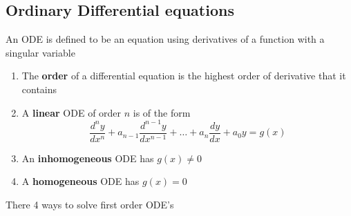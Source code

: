 \documentclass[11pt,titlepage]{article}
\numberwithin{equation}{subsection}
\begin{document}
\subsection{Ordinary Differential equations}
An ODE is defined to be an equation using derivatives of a function with a singular variable
\begin{enumerate}
    \item The \textbf{order} of a differential equation is the highest order of derivative that it contains
    \item A \textbf{linear} ODE of order $n$ is of the form
    \begin{equation}
        \frac{d^ny}{dx^n}+a_{n-1}\frac{d^{n-1}y}{dx^{n-1}}+\dots+a_n\frac{dy}{dx}+a_0y=g(x)
    \end{equation}
    \item An \textbf{inhomogeneous} ODE has $g(x)\neq0$
    \item A \textbf{homogeneous} ODE has $g(x)=0$
\end{enumerate}
There 4 ways to solve first order ODE's
\end{document}

